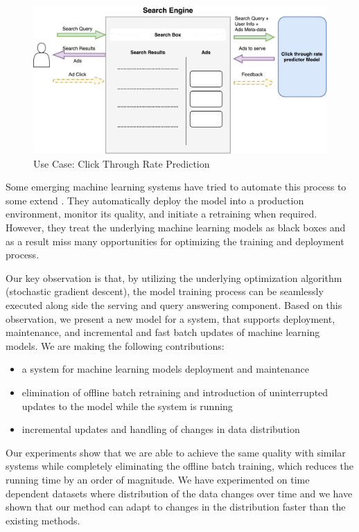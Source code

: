 \documentclass{vldb}
\begin{document}
\begin{figure}[h]
\centering
\includegraphics[width=\columnwidth]{../images/use-case-1.pdf}
\caption{Use Case: Click Through Rate Prediction}
\label{fig:click-rate}
\end{figure}

Some emerging machine learning systems have tried to automate this process to some extend \cite{crankshaw2014missing}.
They automatically deploy the model into a production environment, monitor its quality, and initiate a retraining when required.
However, they treat the underlying machine learning models as black boxes and as a result miss many opportunities for optimizing the training and deployment process.

Our key observation is that, by utilizing the underlying optimization algorithm (stochastic gradient descent), the model training process can be seamlessly executed along side the serving and query answering component.
Based on this observation, we present a new model for a system, that supports deployment, maintenance, and incremental and fast batch updates of machine learning models.
We are making the following contributions: 
\begin{itemize}
\item a system for machine learning models deployment and maintenance
\item elimination of offline batch retraining and introduction of uninterrupted updates to the model while the system is running
\item incremental updates and handling of changes in data distribution
\end{itemize}
Our experiments show that we are able to achieve the same quality with similar systems while completely eliminating the offline batch training, which reduces the running time by an order of magnitude. 
We have experimented on time dependent datasets where distribution of the data changes over time and we have shown that our method can adapt to changes in the distribution faster than the existing methods.
\end{document}
